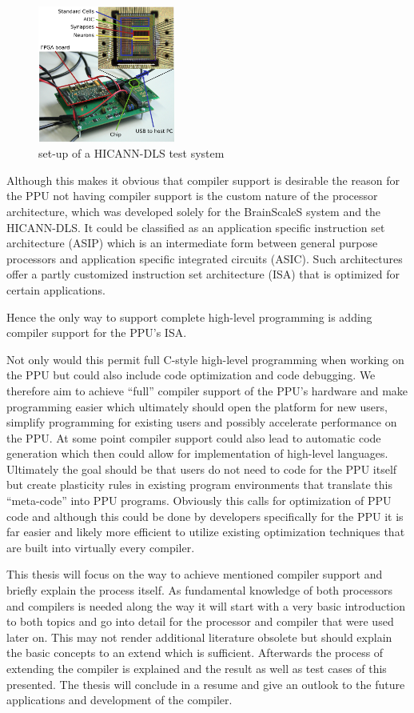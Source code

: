 \begin{figure}
    \centering
    \includegraphics[width=0.4\textwidth]{pictures/Fig1.png}
    \caption{\label{fig:dlsboard} set-up of a HICANN-DLS test system}
\end{figure}
Although this makes it obvious that compiler support is desirable the reason for the PPU not having compiler support is the custom nature of the processor architecture, which was developed solely for the BrainScaleS system and the HICANN-DLS.
It could be classified as an application specific instruction set architecture (ASIP) which is an intermediate form between general purpose processors and application specific integrated circuits (ASIC).
Such architectures offer a partly customized instruction set architecture (ISA) that is optimized for certain applications.

Hence the only way to support complete high-level programming is adding compiler support for the PPU's ISA.

Not only would this permit full C-style high-level programming when working on the PPU but could also include code optimization and code debugging.
We therefore aim to achieve ``full'' compiler support of the PPU's hardware and make programming easier which ultimately should open the platform for new users, simplify programming for existing users and possibly accelerate performance on the PPU.
At some point compiler support could also lead to automatic code generation which then could allow for implementation of high-level languages.
Ultimately the goal should be that users do not need to code for the PPU itself but create plasticity rules in existing program environments that translate this ``meta-code'' into PPU programs.
Obviously this calls for optimization of PPU code and although this could be done by developers specifically for the PPU it is far easier and likely more efficient to utilize existing optimization techniques that are built into virtually every compiler.

This thesis will focus on the way to achieve mentioned compiler support and briefly explain the process itself.
As fundamental knowledge of both processors and compilers is needed along the way it will start with a very basic introduction to both topics and go into detail for the processor and compiler that were used later on.
This may not render additional literature obsolete but should explain the basic concepts to an extend which is sufficient.
Afterwards the process of extending the compiler is explained and the result as well as test cases of this presented.
The thesis will conclude in a resume and give an outlook to the future applications and development of the compiler.

